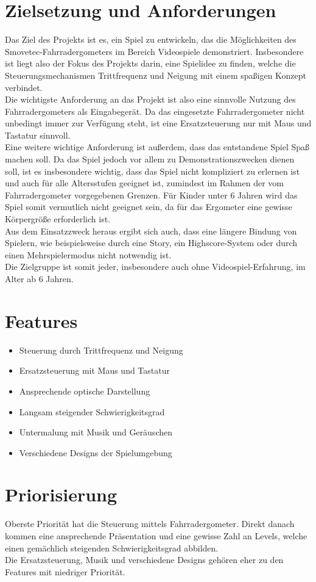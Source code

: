 \section{Zielsetzung und Anforderungen}
Das Ziel des Projekts ist es, ein Spiel zu entwickeln, das die Möglichkeiten des Smovetec-Fahrradergometers im Bereich Videospiele demonstriert. Insbesondere ist liegt also der Fokus des Projekts darin, eine Spielidee zu finden, welche die Steuerungsmechanismen Trittfrequenz und Neigung mit einem spaßigen Konzept verbindet.\\
Die wichtigste Anforderung an das Projekt ist also eine sinnvolle Nutzung des Fahrradergometers als Eingabegerät. Da das eingesetzte Fahrradergometer nicht unbedingt immer zur Verfügung steht, ist eine Ersatzsteuerung nur mit Maus und Tastatur sinnvoll.\\
Eine weitere wichtige Anforderung ist außerdem, dass das entstandene Spiel Spaß machen soll. Da das Spiel jedoch vor allem zu Demonstrationszwecken dienen soll, ist es insbesondere wichtig, dass das Spiel nicht kompliziert zu erlernen ist und auch für alle Altersstufen geeignet ist, zumindest im Rahmen der vom Fahrradergometer vorgegebenen Grenzen. Für Kinder unter 6 Jahren wird das Spiel somit vermutlich nicht geeignet sein, da für das Ergometer eine gewisse Körpergröße erforderlich ist.\\
Aus dem Einsatzzweck heraus ergibt sich auch, dass eine längere Bindung von Spielern, wie beispielsweise durch eine Story, ein Highscore-System oder durch einen Mehrspielermodus nicht notwendig ist.\\
Die Zielgruppe ist somit jeder, insbesondere auch ohne Videospiel-Erfahrung, im Alter ab 6 Jahren.
\section{Features}
\begin{itemize}
\item Steuerung durch Trittfrequenz und Neigung
\item Ersatzsteuerung mit Maus und Tastatur
\item Ansprechende optische Darstellung
\item Langsam steigender Schwierigkeitsgrad
\item Untermalung mit Musik und Geräuschen
\item Verschiedene Designs der Spielumgebung
\end{itemize}


\section{Priorisierung}
Oberste Priorität hat die Steuerung mittels Fahrradergometer. Direkt danach kommen eine ansprechende Präsentation und eine gewisse Zahl an Levels, welche einen gemächlich steigenden Schwierigkeitsgrad abbilden.\\
Die Ersatzsteuerung, Musik und verschiedene Designs gehören eher zu den Features mit niedriger Priorität.